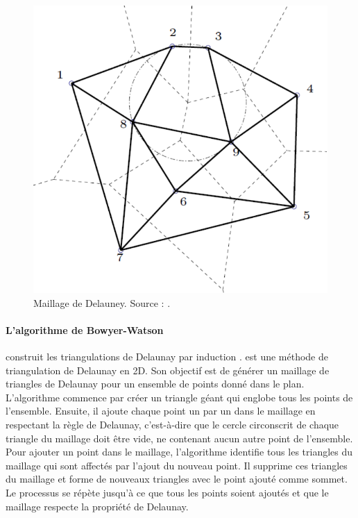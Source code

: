 \begin{figure}[!h]
    \centering
    \includegraphics[scale=0.6]{images/Maillage_delauney.pdf}
    \caption{Maillage de Delauney. Source : \cite{hecht2007maillage}.}
    \label{fig:maillage_delauney}
\end{figure}

\paragraph{L'algorithme de Bowyer-Watson} construit les triangulations de Delaunay par induction \cite{bowyer1981computing, watson1981computing, ern2004theory}.
 est une méthode de triangulation de Delaunay en 2D. Son objectif est de générer un maillage de triangles de Delaunay pour un ensemble de points donné dans le plan. L'algorithme commence par créer un triangle géant qui englobe tous les points de l'ensemble. Ensuite, il ajoute chaque point un par un dans le maillage en respectant la règle de Delaunay, c'est-à-dire que le cercle circonscrit de chaque triangle du maillage doit être vide, ne contenant aucun autre point de l'ensemble. Pour ajouter un point dans le maillage, l'algorithme identifie tous les triangles du maillage qui sont affectés par l'ajout du nouveau point. Il supprime ces triangles du maillage et forme de nouveaux triangles avec le point ajouté comme sommet. Le processus se répète jusqu'à ce que tous les points soient ajoutés et que le maillage respecte la propriété de Delaunay.

